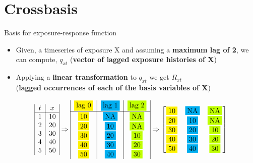\documentclass[english]{beamer}
\newcommand{\alertblue}[1]{{\color{blue}#1}}
\begin{document}
\section{Crossbasis}
\begin{frame}{Basis for exposure-response function}
    \begin{itemize}
        \item Given, a timeseries of exposure X and assuming a \alertblue{\textbf{maximum lag of 2}},  we can compute, \alertblue{\(q_{xt}\)} (\alertblue{\textbf{vector of lagged exposure histories of X}})
        \item Applying a \alertblue{\textbf{linear transformation}} to \alertblue{\( q_{xt} \) } we get \alertblue{\( R_{xt}\)} \\ (\alertblue{\textbf{lagged occurrences of each of the basis variables of X}})
    \end{itemize}
    \vspace{0.5cm}
\[
\begin{array}{|c|c|}
    t & {x} \\ \hline
    1 & 10  \\
    2 & 20  \\
    3 & 30  \\
    4 & 40  \\
    5 & 50  
\end{array} 
\Rightarrow 
\begin{array}{|c|c|c|c|}
    \fcolorbox{white}{yellow}{lag 0} & \fcolorbox{white}{cyan}{lag 1} & \fcolorbox{white}{lime}{lag 2} \\ \hline
    \fcolorbox{white}{yellow}{10} & \fcolorbox{white}{cyan}{NA} & \fcolorbox{white}{lime}{NA} \\
    \fcolorbox{white}{yellow}{20}  & \fcolorbox{white}{cyan}{10} & \fcolorbox{white}{lime}{NA} \\
    \fcolorbox{white}{yellow}{30}  & \fcolorbox{white}{cyan}{20} & \fcolorbox{white}{lime}{10} \\
    \fcolorbox{white}{yellow}{40}  & \fcolorbox{white}{cyan}{30} & \fcolorbox{white}{lime}{20}  \\
    \fcolorbox{white}{yellow}{50}  & \fcolorbox{white}{cyan}{40} & \fcolorbox{white}{lime}{30} 
\end{array}
\Rightarrow  
\begin{bmatrix}
\fcolorbox{white}{yellow}{10} & \fcolorbox{white}{cyan}{NA} & \fcolorbox{white}{lime}{NA} \\
\fcolorbox{white}{yellow}{20} & \fcolorbox{white}{cyan}{10} & \fcolorbox{white}{lime}{NA} \\
\fcolorbox{white}{yellow}{30} & \fcolorbox{white}{cyan}{20} & \fcolorbox{white}{lime}{10} \\
\fcolorbox{white}{yellow}{40} & \fcolorbox{white}{cyan}{30} & \fcolorbox{white}{lime}{20} \\
\fcolorbox{white}{yellow}{50} & \fcolorbox{white}{cyan}{40} & \fcolorbox{white}{lime}{30} \\
\end{bmatrix}
\]
\end{frame}
\end{document}
